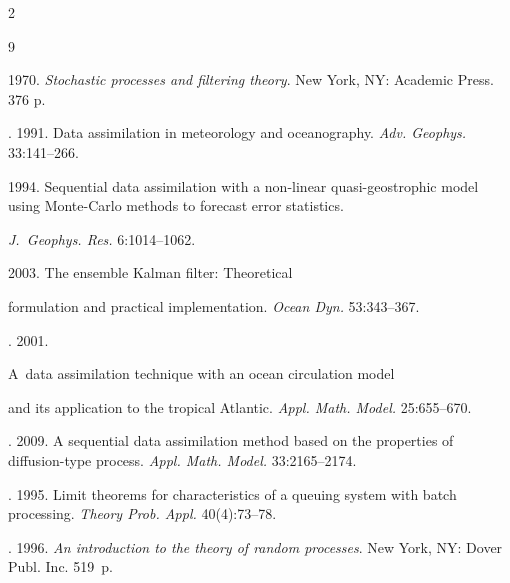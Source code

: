   \begin{multicols}{2}



\renewcommand{\bibname}{\protect\rmfamily References}








{\small\frenchspacing

 {%


 \begin{thebibliography}{9}


 1970. \textit{Stochastic processes and filtering theory}. New York, NY: Academic Press. 376 p.


. 1991. Data assimilation in meteorology and oceanography. \textit{Adv. Geophys.} 33:141--266.


 1994. Sequential data assimilation with a non-linear quasi-geostrophic model using Monte-Carlo methods to forecast error statistics.

\textit{J.~Geophys. Res.} 6:1014--1062.


 2003. The ensemble Kalman filter: Theoretical

formulation and practical implementation. \textit{Ocean Dyn.} 53:343--367.


. 2001.

A~data assimilation technique with an ocean circulation model

and its application to the tropical Atlantic. \textit{Appl. Math. Model.} 25:655--670.


. 2009. A sequential data assimilation method based on the properties of diffusion-type process. \textit{Appl. Math. Model.} 33:2165--2174.


. 1995. Limit theorems for characteristics of a queuing system with batch processing. \textit{Theory Prob. Appl.} 40(4):73--78.


. 1996.  \textit{An introduction to the theory of random processes}. New York, NY: Dover Publ. Inc. 519~p.

\end{thebibliography}



 }

 }



\end{multicols}
